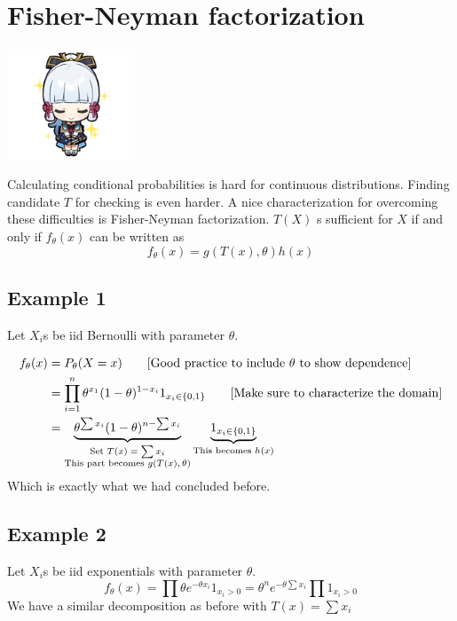 \documentclass[oneside]{book}
\begin{document}
\section{Fisher-Neyman factorization}
\begin{marginfigure}%
    \includegraphics[width=1.5in]{chibis/file_019.png}
\end{marginfigure}%
Calculating conditional probabilities is hard for continuous distributions. Finding candidate $T$ for checking is even harder. A nice characterization for overcoming these difficulties is Fisher-Neyman factorization. $T(X)$ s sufficient for $X$ if and only if $f_\theta(x)$ can be written as 
$$f_\theta(x)=g(T(x),\theta)h(x)$$
\subsection{Example 1}
Let $X_i$s be iid Bernoulli with parameter $\theta$.

\begin{align*}
    f_\theta(x)&=P_\theta(X=x)\tag*{\text{[Good practice to include $\theta$ to show dependence]}}\\
    &=\prod_{i=1}^n\theta^{x_1}(1-\theta)^{1-x_i}1_{x_i\in\{0,1\}}\tag*{\text{[Make sure to characterize the domain]}}\\
    &=\underbrace{\theta^{\sum x_i}(1-\theta)^{n-\sum x_i}}_{\substack{\text{Set $T(x)=\sum x_i$} \\ \text{This part becomes $g(T(x),\theta)$}}}\underbrace{1_{x_i\in\{0,1\}}}_{\text{This becomes $h(x)$}}
\end{align*}
Which is exactly what we had concluded before. 
\subsection{Example 2}
Let $X_i$s be iid exponentials with parameter $\theta$.
$$f_\theta(x)=\prod \theta e^{-\theta x_i}1_{x_i>0}=\theta^ne^{-\theta\sum x_i}\prod 1_{x_i>0}$$
We have a similar decomposition as before with $T(x)=\sum x_i$
\end{document}
